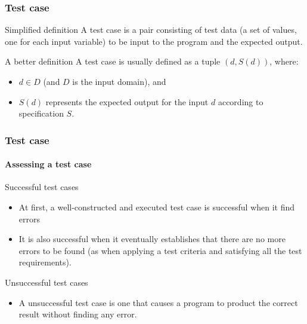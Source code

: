 \begin{frame}[parent={cmap:software-testing-foundations}, hasprev=false, hasnext=true]
\frametitle{Test case}
\label{concept:test-case}
\label{concept:input-domain}
\label{concept:output-domain}
\label{concept:input-data}
\label{concept:output-data}

\begin{block:concept}{Simplified definition}
A test case is a pair consisting of test data (a set of values, one for each
input variable) to be input to the program and the expected output.
\end{block:concept}


\begin{block:concept}{A better definition}
A test case is usually defined as a tuple $(d, S(d))$, where:
\begin{itemize}
	\item $d \in D$ (and $D$ is the input domain), and
	\item $S(d)$ represents the expected output for the input $d$
	according to specification $S$.
\end{itemize}
\end{block:concept}

\hfill
{}
\end{frame}


\begin{frame}[hasprev=false, hasnext=true]
\frametitle{Test case}
\framesubtitle{Assessing a test case}
\label{concept:test-case-success}
\label{concept:test-case-failure}

\begin{block:fact}{Successful test cases}
\begin{itemize}
	\item At first, a well-constructed and executed test case is successful
	when it find errors~\cite[p. 7]{myers:2004}

	\item It is also successful when it eventually establishes that there are
	no more errors to be found (as when applying a test criteria and satisfying
	all the test requirements).
\end{itemize}
\end{block:fact}

\begin{block:fact}{Unsuccessful test cases}
\begin{itemize}
	\item A unsuccessful test case is one that causes a program to product the
	correct result without finding any error.
\end{itemize}
\end{block:fact}

\hfill
{}
\end{frame}



